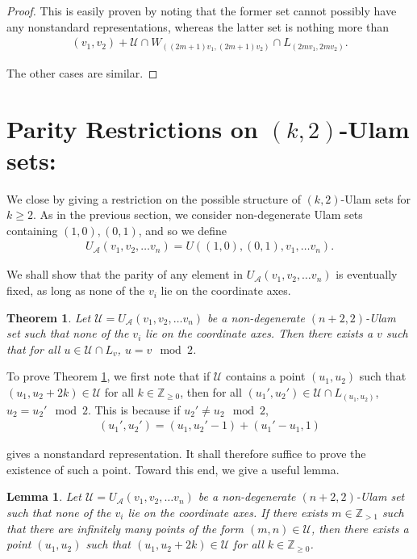 \documentclass{amsart}
\newcommand{\ZZ}{\mathbb{Z}}
\newcommand{\U}{\mathcal{U}}
\newcommand{\A}{\mathcal{A}}
\theoremstyle{theorem}
\newtheorem{theorem}{Theorem}[section]
\newtheorem{lemma}{Lemma}[section]
\theoremstyle{definition}
\begin{document}
\begin{proof}
\noindent This is easily proven by noting that the former set cannot possibly have any nonstandard representations, whereas the latter set is nothing more than
	\begin{align*}
    (v_1, v_2) + \U \cap W_{\left((2m + 1)v_1, (2m + 1)v_2\right)} \cap L_{(2mv_1, 2mv_2)}.
    \end{align*}

\noindent The other cases are similar.
\end{proof}

\section{Parity Restrictions on $(k,2)$-Ulam sets:}\label{Parity Section}

We close by giving a restriction on the possible structure of $(k,2)$-Ulam sets for $k \geq 2$. As in the previous section, we consider non-degenerate Ulam sets containing $(1,0), (0,1)$, and so we define
	\begin{align*}
    U_\A(v_1, v_2, \ldots v_n) = U\left((1,0),(0,1),v_1, \ldots v_n\right).
    \end{align*}
    
\noindent We shall show that the parity of any element in $U_\A(v_1, v_2, \ldots v_n)$ is eventually fixed, as long as none of the $v_i$ lie on the coordinate axes.

\begin{theorem}\label{Parity Theorem}
Let $\U = U_\A(v_1, v_2, \ldots v_n)$ be a non-degenerate $(n + 2, 2)$-Ulam set such that none of the $v_i$ lie on the coordinate axes. Then there exists a $v$ such that for all $u \in \U \cap L_v$, $u = v \mod 2$.
\end{theorem}

To prove Theorem \ref{Parity Theorem}, we first note that if $\U$ contains a point $(u_1, u_2)$ such that $(u_1, u_2 + 2k) \in \U$ for all $k \in \ZZ_{\geq 0}$, then for all $(u_1', u_2') \in \U \cap L_{(u_1, u_2)}$, $u_2 = u_2' \mod 2$. This is because if $u_2' \neq u_2 \mod 2$,
	\begin{align*}
    (u_1', u_2') = (u_1, u_2' - 1) + (u_1' - u_1, 1)
    \end{align*}

\noindent gives a nonstandard representation. It shall therefore suffice to prove the existence of such a point. Toward this end, we give a useful lemma.

\begin{lemma}\label{Infinite to Parity}
Let $\U = U_\A(v_1, v_2, \ldots v_n)$ be a non-degenerate $(n + 2, 2)$-Ulam set such that none of the $v_i$ lie on the coordinate axes. If there exists $m \in \ZZ_{> 1}$ such that there are infinitely many points of the form $(m,n) \in \U$, then there exists a point $(u_1, u_2)$ such that $(u_1, u_2 + 2k) \in \U$ for all $k \in \ZZ_{\geq 0}$.
\end{lemma}
\end{document}
